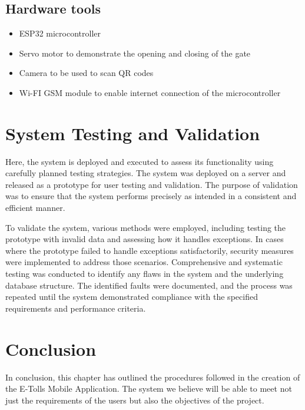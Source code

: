 \subsection{Hardware tools}
\begin{itemize}
    \item ESP32 microcontroller
    \item Servo motor to demonstrate the opening and closing of the gate
    \item Camera to be used to scan QR codes
    \item Wi-FI GSM module to enable internet connection of the microcontroller
\end{itemize}


\section{System Testing and Validation}
Here,  the system is deployed and executed to assess its functionality using carefully planned testing strategies. The system was deployed on a server and released as a prototype for user testing and validation. The purpose of validation was to ensure that the system performs precisely as intended in a consistent and efficient manner.

To validate the system, various methods were employed, including testing the prototype with invalid data and assessing how it handles exceptions. In cases where the prototype failed to handle exceptions satisfactorily, security measures were implemented to address those scenarios. Comprehensive and systematic testing was conducted to identify any flaws in the system and the underlying database structure. The identified faults were documented, and the process was repeated until the system demonstrated compliance with the specified requirements and performance criteria.


\section{Conclusion}
In conclusion, this chapter has outlined the procedures followed in the creation of the E-Tolls Mobile Application. The system we believe will be able to meet not just the requirements of the users but also the objectives of the project.
